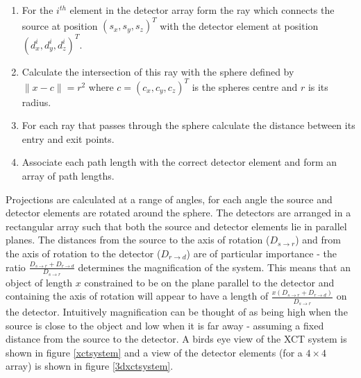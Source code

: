 \documentclass[
  twoside,
  11pt, a4paper,
  footinclude=true,
  headinclude=true,
  cleardoublepage=empty
]{scrbook}
\begin{document}
\begin{enumerate}
\item For the $i^{th}$ element in the detector array form the ray which connects the source at position $(s_x,s_y,s_z)^T$ with the detector element at position $(d_x^i,d_y^i,d_z^i)^T$.
\item Calculate the intersection of this ray with the sphere defined by $\|x - c\| = r^2$ where $c = (c_x,c_y,c_z)^T$ is the spheres centre and $r$ is its radius.
\item For each ray that passes through the sphere calculate the distance between its entry and exit points.
\item Associate each path length with the correct detector element and form an array of path lengths.
\end{enumerate}

Projections are calculated at a range of angles, for each angle the source and detector elements are rotated around the sphere. The detectors are arranged in a rectangular array such that both the source and detector elements lie in parallel planes. The distances from the source to the axis of rotation ($D_{s\rightarrow r}$) and from the axis of rotation to the detector ($D_{r \rightarrow d}$) are of particular importance - the ratio $\frac{D_{s\rightarrow r}+D_{r \rightarrow d}}{D_{s\rightarrow r}}$ determines the magnification of the system. This means that an object of length $x$ constrained to be on the plane parallel to the detector and containing the axis of rotation will appear to have a length of $\frac{x(D_{s\rightarrow r}+D_{r \rightarrow d})}{D_{s\rightarrow r}}$ on the detector. Intuitively magnification can be thought of as being high when the source is close to the object and low when it is far away - assuming a fixed distance from the source to the detector. A birds eye view of the XCT system is shown in figure \ref{xctsystem} and a view of the detector elements (for a $4\times4$ array) is shown in figure \ref{3dxctsystem}.
\end{document}
